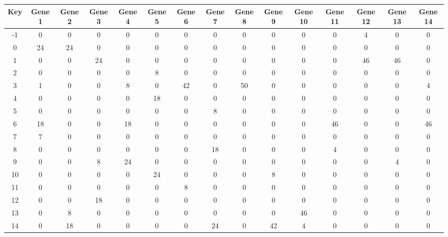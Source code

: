 \begin{tabular}{|c|c|c|c|c|c|c|c|c|c|c|c|c|c|c|}
\hline
Key & Gene 1 & Gene 2 & Gene 3 & Gene 4 & Gene 5 & Gene 6 & Gene 7 & Gene 8 & Gene 9 & Gene 10 & Gene 11 & Gene 12 & Gene 13 & Gene 14 \\
\hline
-1 & 0 & 0 & 0 & 0 & 0 & 0 & 0 & 0 & 0 & 0 & 0 & 4 & 0 & 0 \\
0 & 24 & 24 & 0 & 0 & 0 & 0 & 0 & 0 & 0 & 0 & 0 & 0 & 0 & 0 \\
1 & 0 & 0 & 24 & 0 & 0 & 0 & 0 & 0 & 0 & 0 & 0 & 46 & 46 & 0 \\
2 & 0 & 0 & 0 & 0 & 8 & 0 & 0 & 0 & 0 & 0 & 0 & 0 & 0 & 0 \\
3 & 1 & 0 & 0 & 8 & 0 & 42 & 0 & 50 & 0 & 0 & 0 & 0 & 0 & 4 \\
4 & 0 & 0 & 0 & 0 & 18 & 0 & 0 & 0 & 0 & 0 & 0 & 0 & 0 & 0 \\
5 & 0 & 0 & 0 & 0 & 0 & 0 & 8 & 0 & 0 & 0 & 0 & 0 & 0 & 0 \\
6 & 18 & 0 & 0 & 18 & 0 & 0 & 0 & 0 & 0 & 0 & 46 & 0 & 0 & 46 \\
7 & 7 & 0 & 0 & 0 & 0 & 0 & 0 & 0 & 0 & 0 & 0 & 0 & 0 & 0 \\
8 & 0 & 0 & 0 & 0 & 0 & 0 & 18 & 0 & 0 & 0 & 4 & 0 & 0 & 0 \\
9 & 0 & 0 & 8 & 24 & 0 & 0 & 0 & 0 & 0 & 0 & 0 & 0 & 4 & 0 \\
10 & 0 & 0 & 0 & 0 & 24 & 0 & 0 & 0 & 8 & 0 & 0 & 0 & 0 & 0 \\
11 & 0 & 0 & 0 & 0 & 0 & 8 & 0 & 0 & 0 & 0 & 0 & 0 & 0 & 0 \\
12 & 0 & 0 & 18 & 0 & 0 & 0 & 0 & 0 & 0 & 0 & 0 & 0 & 0 & 0 \\
13 & 0 & 8 & 0 & 0 & 0 & 0 & 0 & 0 & 0 & 46 & 0 & 0 & 0 & 0 \\
14 & 0 & 18 & 0 & 0 & 0 & 0 & 24 & 0 & 42 & 4 & 0 & 0 & 0 & 0 \\
\hline
\end{tabular}